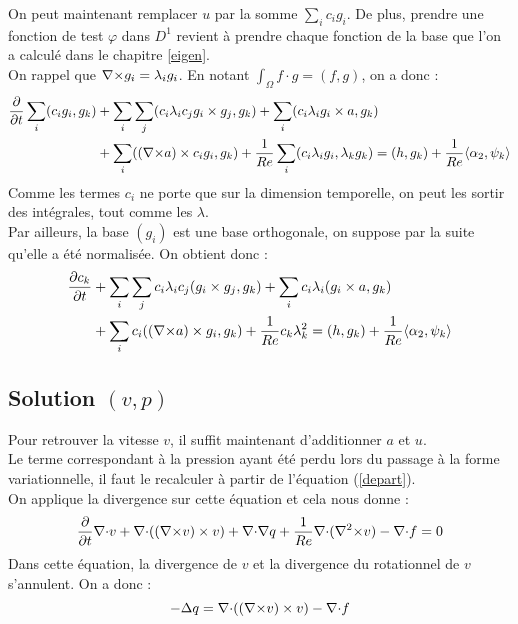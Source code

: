 On peut maintenant remplacer $u$ par la somme $\sum_ic_ig_i$. De plus, prendre une fonction de test $\varphi$ dans $D^1$ revient à prendre chaque fonction de la base que l'on a calculé dans le chapitre \ref{eigen}.\\
On rappel que ${\nabla\times} g_i=\lambda_ig_i$. En notant $\int_\Omega f\cdot g=(f,g)$, on a donc :
\begin{align*}
\frac{\partial}{\partial t}\sum_i (c_ig_i, g_k) &+ \sum_i\sum_j (c_i\lambda_ic_jg_i\times g_j,g_k) + \sum_i(c_i\lambda_ig_i\times a,g_k)\\
&+ \sum_i (({\nabla\times} a)\times c_ig_i,g_k) + \frac{1}{Re}\sum_i(c_i\lambda_ig_i, \lambda_kg_k) = (h,g_k) + \frac{1}{Re}\langle\alpha_2,\psi_k\rangle
\end{align*}
Comme les termes $c_i$ ne porte que sur la dimension temporelle, on peut les sortir des intégrales, tout comme les $\lambda$.\\
Par ailleurs, la base $(g_i)$ est une base orthogonale, on suppose par la suite qu'elle a été normalisée. On obtient donc :
\begin{align*}
\frac{\partial c_k}{\partial t} &+ \sum_i\sum_j c_i\lambda_i c_j(g_i\times g_j, g_k) + \sum_i c_i\lambda_i(g_i\times a,g_k)\\
&+ \sum_i c_i(({\nabla\times} a)\times g_i, g_k) + \frac{1}{Re}c_k\lambda_k^2 = (h,g_k) + \frac{1}{Re}\langle\alpha_2,\psi_k\rangle
\end{align*}
 
\subsection{Solution $(v,p)$}
\label{pression}

Pour retrouver la vitesse $v$, il suffit maintenant d'additionner $a$ et $u$.\\
Le terme correspondant à la pression ayant été perdu lors du passage à la forme variationnelle, il faut le recalculer à partir de l'équation (\ref{depart}).\\

On applique la divergence sur cette équation et cela nous donne :
\[
\frac{\partial}{\partial t}{\nabla\cdot} v + {\nabla\cdot}(({\nabla\times} v)\times v) + {\nabla\cdot}\nabla q + \frac{1}{Re}{\nabla\cdot}({\nabla^2\times} v) - {\nabla\cdot} f = 0
\]
Dans cette équation, la divergence de $v$ et la divergence du rotationnel de $v$ s'annulent. On a donc :
\[
-\Delta q = {\nabla\cdot}(({\nabla\times} v)\times v) - {\nabla\cdot} f
\]

